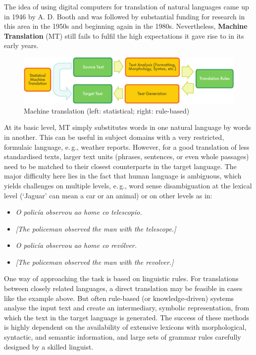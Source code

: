 \begin{multicols}{2}
The idea of using digital computers for translation of natural languages came up in 1946 by A. D. Booth and was followed by substantial funding for research in this area in the 1950s and beginning again in the 1980s. Nevertheless, \textbf{Machine Translation} (MT) still fails to fulfil the high expectations it gave rise to in its early years. 


\begin{figure}[htb]
  \center
  \includegraphics[width=\textwidth]{../_media/english/machine_translation}
  \caption{Machine translation (left: statistical; right: rule-based)}
  \label{fig:mtarch_en}
\end{figure}

At its basic level, MT simply substitutes words in one natural language by words in another. This can be useful in subject domains with a very restricted, formulaic language, e.\,g., weather reports. However, for a good translation of less standardised texts, larger text units (phrases, sentences, or even whole passages) need to be matched to their closest counterparts in the target language. The major difficulty here lies in the fact that human language is ambiguous, which yields challenges on multiple levels, e.\,g., word sense disambiguation at the lexical level (‘Jaguar’ can mean a car or an animal) or on other levels as in:

\begin{itemize}
\item[] \textit{O policía observou ao home co telescopio.}
\item[] \textit{[The policeman observed the man with the telescope.]}
\item[] \textit{O policía observou ao home co revólver.}
\item[] \textit{[The policeman observed the man with the revolver.]}
\end{itemize}

One way of approaching the task is based on linguistic rules. For translations between closely related languages, a direct translation may be feasible in cases like the example above. But often rule-based (or knowledge-driven) systems analyse the input text and create an intermediary, symbolic representation, from which the text in the target language is generated. The success of these methods is highly dependent on the availability of extensive lexicons with morphological, syntactic, and semantic information, and large sets of grammar rules carefully designed by a skilled linguist.


\end{multicols}
